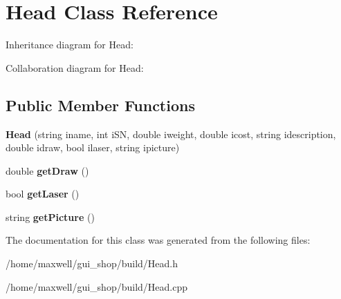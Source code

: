 \hypertarget{classHead}{}\section{Head Class Reference}
\label{classHead}


Inheritance diagram for Head\+:


Collaboration diagram for Head\+:
\subsection*{Public Member Functions}
\begin{DoxyCompactItemize}
\item 
{\bfseries Head} (string iname, int i\+SN, double iweight, double icost, string idescription, double idraw, bool ilaser, string ipicture)\hypertarget{classHead_afcfdc7cca4db48ab3c43bbad1841e529}{}\label{classHead_afcfdc7cca4db48ab3c43bbad1841e529}

\item 
double {\bfseries get\+Draw} ()\hypertarget{classHead_af9f82fb9aa0437a19cfef4f77b118cde}{}\label{classHead_af9f82fb9aa0437a19cfef4f77b118cde}

\item 
bool {\bfseries get\+Laser} ()\hypertarget{classHead_a6f3094d049b3c880317789d3dcd60171}{}\label{classHead_a6f3094d049b3c880317789d3dcd60171}

\item 
string {\bfseries get\+Picture} ()\hypertarget{classHead_a363d69484fce296182504762ee67252e}{}\label{classHead_a363d69484fce296182504762ee67252e}

\end{DoxyCompactItemize}


The documentation for this class was generated from the following files\+:\begin{DoxyCompactItemize}
\item 
/home/maxwell/gui\+\_\+shop/build/Head.\+h\item 
/home/maxwell/gui\+\_\+shop/build/Head.\+cpp\end{DoxyCompactItemize}
